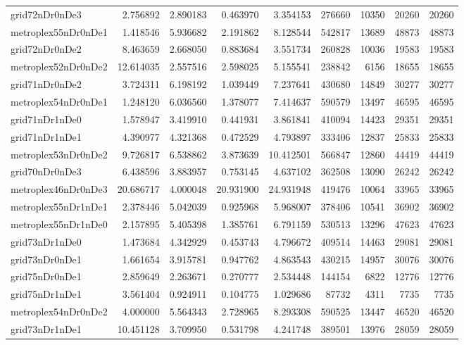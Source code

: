 \begin{longtable}{|l|r|r|r|r|r|r|r|r|}
grid72nDr0nDe3 & 2.756892 & 2.890183 & 0.463970 & 3.354153 & 276660 & 10350 & 20260 & 20260 \\
metroplex55nDr0nDe1 & 1.418546 & 5.936682 & 2.191862 & 8.128544 & 542817 & 13689 & 48873 & 48873 \\
grid72nDr0nDe2 & 8.463659 & 2.668050 & 0.883684 & 3.551734 & 260828 & 10036 & 19583 & 19583 \\
metroplex52nDr0nDe2 & 12.614035 & 2.557516 & 2.598025 & 5.155541 & 238842 & 6156 & 18655 & 18655 \\
grid71nDr0nDe2 & 3.724311 & 6.198192 & 1.039449 & 7.237641 & 430680 & 14849 & 30277 & 30277 \\
metroplex54nDr0nDe1 & 1.248120 & 6.036560 & 1.378077 & 7.414637 & 590579 & 13497 & 46595 & 46595 \\
grid71nDr1nDe0 & 1.578947 & 3.419910 & 0.441931 & 3.861841 & 410094 & 14423 & 29351 & 29351 \\
grid71nDr1nDe1 & 4.390977 & 4.321368 & 0.472529 & 4.793897 & 333406 & 12837 & 25833 & 25833 \\
metroplex53nDr0nDe2 & 9.726817 & 6.538862 & 3.873639 & 10.412501 & 566847 & 12860 & 44419 & 44419 \\
grid70nDr0nDe3 & 6.438596 & 3.883957 & 0.753145 & 4.637102 & 362508 & 13090 & 26242 & 26242 \\
metroplex46nDr0nDe3 & 20.686717 & 4.000048 & 20.931900 & 24.931948 & 419476 & 10064 & 33965 & 33965 \\
metroplex55nDr1nDe1 & 2.378446 & 5.042039 & 0.925968 & 5.968007 & 378406 & 10541 & 36902 & 36902 \\
metroplex55nDr1nDe0 & 2.157895 & 5.405398 & 1.385761 & 6.791159 & 530513 & 13296 & 47623 & 47623 \\
grid73nDr1nDe0 & 1.473684 & 4.342929 & 0.453743 & 4.796672 & 409514 & 14463 & 29081 & 29081 \\
grid73nDr0nDe1 & 1.661654 & 3.915781 & 0.947762 & 4.863543 & 430215 & 14957 & 30076 & 30076 \\
grid75nDr0nDe1 & 2.859649 & 2.263671 & 0.270777 & 2.534448 & 144154 & 6822 & 12776 & 12776 \\
grid75nDr1nDe1 & 3.561404 & 0.924911 & 0.104775 & 1.029686 & 87732 & 4311 & 7735 & 7735 \\
metroplex54nDr0nDe2 & 4.000000 & 5.564343 & 2.728965 & 8.293308 & 590525 & 13447 & 46520 & 46520 \\
grid73nDr1nDe1 & 10.451128 & 3.709950 & 0.531798 & 4.241748 & 389501 & 13976 & 28059 & 28059 \\

\end{longtable}
